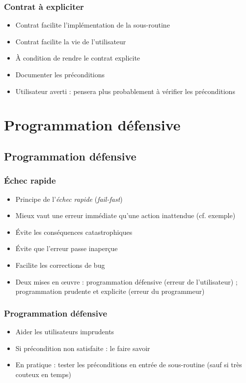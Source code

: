 \documentclass[english, french]{beamer}
\begin{document}
\begin{frame}
	\frametitle{Contrat à expliciter}
	\begin{itemize}
		\item Contrat facilite l’implémentation de la sous-routine
		\item Contrat facilite la vie de l’utilisateur
		\item À condition de rendre le contrat explicite
		\item Documenter les préconditions
		\item Utilisateur averti : pensera plus probablement à vérifier les préconditions
	\end{itemize}
\end{frame}

\section{Programmation défensive}
\subsection{Programmation défensive}
\begin{frame}
	\frametitle{Échec rapide}
	\begin{itemize}
		\item Principe de l’\emph{échec rapide} (\emph{fail-fast})
		\item Mieux vaut une erreur immédiate qu’une action inattendue (cf. exemple)
		\item Évite les conséquences catastrophiques
		\item Évite que l’erreur passe inaperçue
		\item Facilite les corrections de bug
		\item Deux mises en œuvre : programmation défensive (erreur de l’utilisateur) ; programmation prudente et explicite (erreur du programmeur)
	\end{itemize}
\end{frame}

\begin{frame}
	\frametitle{Programmation défensive}
	\begin{itemize}
		\item Aider les utilisateurs imprudents
		\item Si précondition non satisfaite : le faire savoir
		\item En pratique : tester les préconditions en entrée de sous-routine {\tiny (sauf si très couteux en temps)}
	\end{itemize}
\end{frame}
\end{document}
